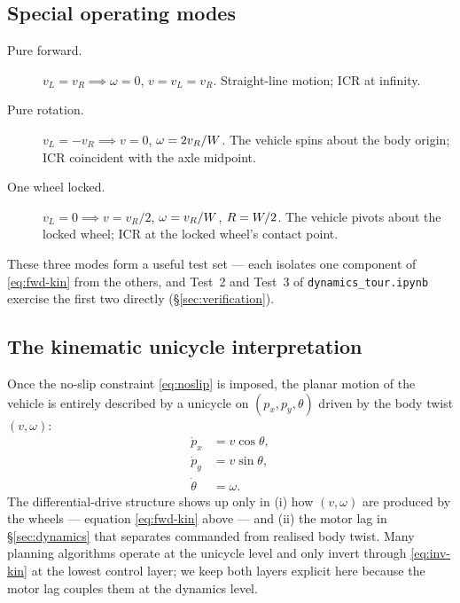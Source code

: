 \subsection{Special operating modes}
\begin{description}
    \item[Pure forward.] $v_L = v_R \implies \omega = 0$, $v = v_L = v_R$. Straight-line motion; ICR at infinity.
    \item[Pure rotation.] $v_L = -v_R \implies v = 0$, $\omega = 2 v_R / W$. The vehicle spins about the body origin; ICR coincident with the axle midpoint.
    \item[One wheel locked.] $v_L = 0 \implies v = v_R/2$, $\omega = v_R/W$, $R = W/2$. The vehicle pivots about the locked wheel; ICR at the locked wheel's contact point.
\end{description}

These three modes form a useful test set --- each isolates one component of \eqref{eq:fwd-kin} from the others, and Test~2 and Test~3 of \texttt{dynamics\_tour.ipynb} exercise the first two directly (\S\ref{sec:verification}).

\subsection{The kinematic unicycle interpretation}

Once the no-slip constraint \eqref{eq:noslip} is imposed, the planar motion of the vehicle is entirely described by a unicycle on $(p_x, p_y, \theta)$ driven by the body twist $(v, \omega)$:
\begin{align}
    \dot p_x   &= v\cos\theta, \\
    \dot p_y   &= v\sin\theta, \\
    \dot\theta &= \omega.
    \label{eq:unicycle}
\end{align}
The differential-drive structure shows up only in (i) how $(v, \omega)$ are produced by the wheels --- equation \eqref{eq:fwd-kin} above --- and (ii) the motor lag in \S\ref{sec:dynamics} that separates commanded from realised body twist. Many planning algorithms operate at the unicycle level and only invert through \eqref{eq:inv-kin} at the lowest control layer; we keep both layers explicit here because the motor lag couples them at the dynamics level.
